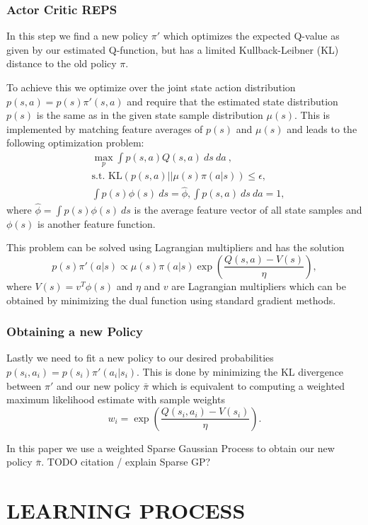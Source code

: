 \documentclass[twoside]{article}
\begin{document}
\subsubsection{Actor Critic REPS}
In this step we find a new policy $\pi'$ which optimizes the expected Q-value
as given by our estimated Q-function, but has a limited Kullback-Leibner (KL)
distance to the old policy $\pi$.

To achieve this we optimize over the joint state action distribution
$p(s,a) = p(s) \pi'(s, a)$ and require that the estimated state distribution
$p(s)$ is the same as in the given state sample distribution $\mu(s)$.
This is implemented by matching feature averages of $p(s)$ and $\mu(s)$ and
leads to the following optimization problem:
\begin{align}
    & \max_p \int p(s, a)Q(s, a)\:ds\:da\:, \\
    & \text{s.t. } \text{KL}(p(s, a) || \mu(s)\pi(a|s)) \leq \epsilon,\\
    & \int p(s)\phi(s)\:ds = \hat{\phi}, \int p(s, a)\:ds\:da = 1,
\end{align}
where $\hat{\phi} = \int p(s) \phi(s)\:ds$ is the average feature vector of all
state samples and $\phi(s)$ is another feature function.

This problem can be solved using Lagrangian multipliers and has the solution
$$
p(s)\pi'(a|s) \propto \mu(s) \pi(a|s) \exp\left(\frac{Q(s,a) - V(s)}{\eta}\right),
$$
where $V(s) = v^T \phi(s)$ and $\eta$ and $v$ are Lagrangian multipliers which
can be obtained by minimizing the dual function using standard gradient methods.

\subsubsection{Obtaining a new Policy}
Lastly we need to fit a new policy to our desired probabilities
$p(s_i, a_i) = p(s_i) \pi'(a_i|s_i)$. This is done by minimizing the KL
divergence between $\pi'$ and our new policy $\bar{\pi}$ which is equivalent to
computing a weighted maximum likelihood estimate with sample weights
$$
w_i = \exp\left(\frac{Q(s_i, a_i) - V(s_i)}{\eta}\right).
$$

In this paper we use a weighted Sparse Gaussian Process to obtain our new policy
$\bar{\pi}$. TODO citation / explain Sparse GP?

\section{LEARNING PROCESS}
\end{document}
